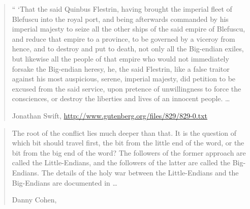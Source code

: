 \begin{new}
    \begin{quote}
        `` `That the said Quinbus Flestrin, having brought the imperial fleet of
        Blefuscu into the royal port, and being afterwards commanded by his
        imperial majesty to seize all the other ships of the said empire of
        Blefuscu, and reduce that empire to a province, to be governed by a
        viceroy from hence, and to destroy and put to death, not only all the
        Big-endian exiles, but likewise all the people of that empire who would
        not immediately forsake the Big-endian heresy, he, the said Flestrin,
        like a false traitor against his most auspicious, serene, imperial
        majesty, did petition to be excused from the said service, upon pretence
        of unwillingness to force the consciences, or destroy the liberties and
        lives of an innocent people. \dots

        \begin{flushright}
            Jonathan Swift, 
            \url{http://www.gutenberg.org/files/829/829-0.txt}
        \end{flushright}
    \end{quote}

    \begin{quote}
        The root of the conflict lies much deeper than that. It is the question
        of which bit should travel first, the bit from the little end of the
        word, or the bit from the big end of the word? The followers of the
        former approach are called the Little-Endians, and the followers of the
        latter are called the Big-Endians. The details of the holy war between
        the Little-Endians and the Big-Endians are documented in
         \dots

        \begin{flushright}
            Danny Cohen, 
        \end{flushright}
    \end{quote}
\end{new}

